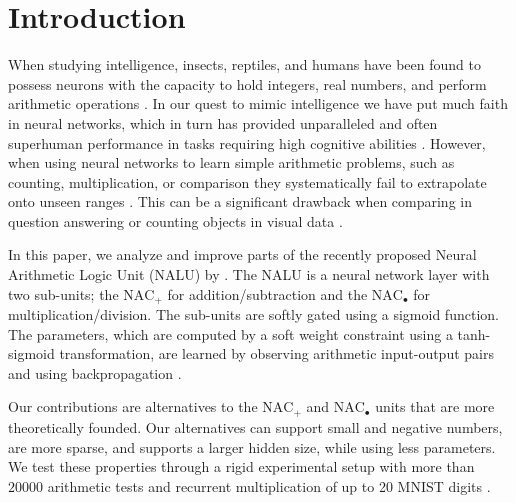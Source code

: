 \section{Introduction}
When studying intelligence, insects, reptiles, and humans have been found to possess neurons with the capacity to hold integers, real numbers, and perform arithmetic operations \cite{nieder-neuronal-number,rugani-arithmetic-chicks,gallistel-numbers-in-brain}.
In our quest to mimic intelligence we have put much faith in neural networks, which in turn has provided unparalleled and often superhuman performance in tasks requiring high cognitive abilities \cite{natureGo,bert,openai-learning-dexterous}.
However, when using neural networks to learn simple arithmetic problems, such as counting, multiplication, or comparison they systematically fail to extrapolate onto unseen ranges \cite{stillNotSystematic,suzgun2019evaluating,trask-nalu}. This can be a significant drawback when comparing in question answering \cite{naturalquestions} or counting objects in visual data \cite{johnson2017clevr,drewspaper}.

In this paper, we analyze and improve parts of the recently proposed Neural Arithmetic Logic Unit (NALU) by \citet{trask-nalu}.
The NALU is a neural network layer with two sub-units; the $\text{NAC}_{+}$ for addition/subtraction and the $\text{NAC}_{\bullet}$ for multiplication/division.
The sub-units are softly gated using a sigmoid function.
The parameters, which are computed by a soft weight constraint using a tanh-sigmoid transformation, are learned by observing arithmetic input-output pairs and using backpropagation \cite{rumelhart1986learning}.

Our contributions are alternatives to the $\text{NAC}_{+}$ and $\text{NAC}_{\bullet}$ units that are more theoretically founded.
Our alternatives can support small and negative numbers, are more sparse, and supports a larger hidden size, while using less parameters.
We test these properties through a rigid experimental setup with more than $20000$ arithmetic tests and recurrent multiplication of up to 20 MNIST digits \cite{mnist}.

